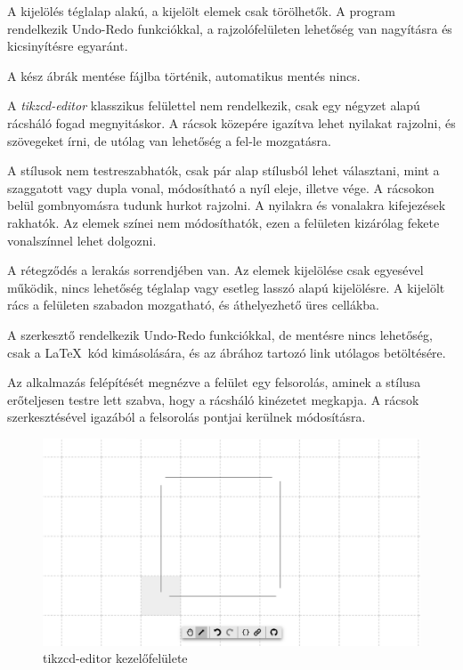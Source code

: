 A kijelölés téglalap alakú, a kijelölt elemek csak törölhetők. A program rendelkezik Undo-Redo funkciókkal, a rajzolófelületen lehetőség van nagyításra és kicsinyítésre egyaránt. 

A kész ábrák mentése fájlba történik, automatikus mentés nincs.


A \textit{tikzcd-editor} klasszikus felülettel nem rendelkezik, csak egy négyzet alapú rácsháló fogad megnyitáskor. A rácsok közepére igazítva lehet nyilakat rajzolni, és szövegeket írni, de utólag van lehetőség a fel-le mozgatásra. 

A stílusok nem testreszabhatók, csak pár alap stílusból lehet választani, mint a szaggatott vagy dupla vonal, módosítható a nyíl eleje, illetve vége. A rácsokon belül gombnyomásra tudunk hurkot rajzolni. A nyilakra és vonalakra kifejezések rakhatók. Az elemek színei nem módosíthatók, ezen a felületen kizárólag fekete vonalszínnel lehet dolgozni.

A rétegződés a lerakás sorrendjében van. Az elemek kijelölése csak egyesével működik, nincs lehetőség téglalap vagy esetleg lasszó alapú kijelölésre. A kijelölt rács a felületen szabadon mozgatható, és áthelyezhető üres cellákba.

A szerkesztő rendelkezik Undo-Redo funkciókkal, de mentésre nincs lehetőség, csak a \LaTeX\ kód kimásolására, és az ábrához tartozó link utólagos betöltésére.

Az alkalmazás felépítését megnézve a felület egy felsorolás, aminek a stílusa erőteljesen testre lett szabva, hogy a rácsháló kinézetet megkapja. A rácsok szerkesztésével igazából a felsorolás pontjai kerülnek módosításra.

\begin{figure}[!h]
	\includegraphics[width=\textwidth]{images/tikzcd.png}
	\caption{tikzcd-editor kezelőfelülete \cite{tikzcd}}
	\label{fig:tikzcd}
\end{figure}


